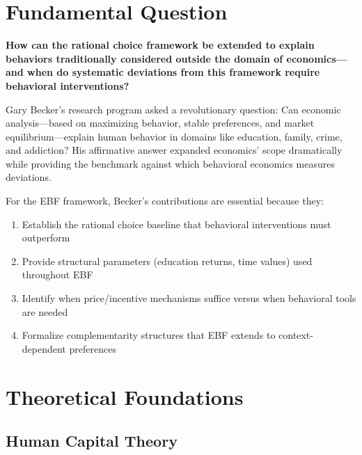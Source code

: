 \section{Fundamental Question}
\label{sec:gb-fundamental}

\begin{tcolorbox}[colback=red!5!white,colframe=red!75!black,title=Fundamental Question]
\textbf{How can the rational choice framework be extended to explain behaviors traditionally considered outside the domain of economics---and when do systematic deviations from this framework require behavioral interventions?}
\end{tcolorbox}

Gary Becker's research program asked a revolutionary question: Can economic analysis---based on maximizing behavior, stable preferences, and market equilibrium---explain human behavior in domains like education, family, crime, and addiction? His affirmative answer expanded economics' scope dramatically while providing the benchmark against which behavioral economics measures deviations.

For the EBF framework, Becker's contributions are essential because they:
\begin{enumerate}
    \item Establish the rational choice baseline that behavioral interventions must outperform
    \item Provide structural parameters (education returns, time values) used throughout EBF
    \item Identify when price/incentive mechanisms suffice versus when behavioral tools are needed
    \item Formalize complementarity structures that EBF extends to context-dependent preferences
\end{enumerate}

\section{Theoretical Foundations}
\label{sec:gb-theory}

\subsection{Human Capital Theory}
\label{subsec:gb-human-capital}

